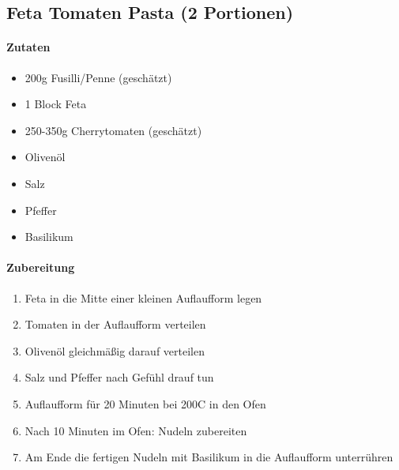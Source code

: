 \newpage
\subsection{Feta Tomaten Pasta (2 Portionen)}
\paragraph{Zutaten}
\begin{itemize}[noitemsep]
	\item 200g Fusilli/Penne (geschätzt)
	\item 1 Block Feta
	\item 250-350g Cherrytomaten (geschätzt)
	\item Olivenöl
	\item Salz
	\item Pfeffer
	\item Basilikum
\end{itemize}
\paragraph{Zubereitung}
\begin{enumerate}[noitemsep]
	\item Feta in die Mitte einer kleinen Auflaufform legen
	\item Tomaten in der Auflaufform verteilen
	\item Olivenöl gleichmäßig darauf verteilen
	\item Salz und Pfeffer nach Gefühl drauf tun
	\item Auflaufform für 20 Minuten bei 200\textdegree C in den Ofen 
	\item Nach 10 Minuten im Ofen: Nudeln zubereiten
	\item Am Ende die fertigen Nudeln mit Basilikum in die Auflaufform unterrühren
\end{enumerate}
\vspace{0.5cm}
